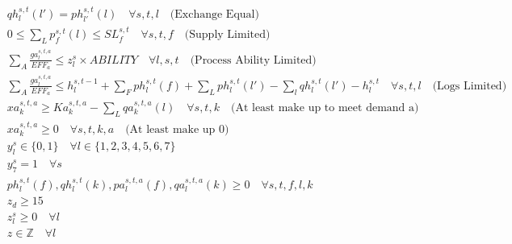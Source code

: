 \documentclass[fleqn,10pt]{wlscirep}
\begin{document}
{\begin{align}
    & qh_{l}^{s, t}(l') = ph_{l'}^{s, t}(l) \quad \forall s, t, l \quad \text{(Exchange Equal)} \\
    & 0 \leq \sum_{L} p_{f}^{s, t}(l) \leq SL_{f}^{s, t} \quad \forall s, t, f  \quad \text{(Supply Limited)} \\
    & \sum_A \frac{ga_{l}^{s, t, a}}{EFF_a} \leq z_{l}^{s} \times ABILITY \quad \forall l, s, t \quad \text{(Process Ability Limited)} \\
    & \sum_A \frac{ga_{l}^{s, t, a}}{EFF_a} \leq h_{l}^{s, t-1} + \sum_{F} ph_{l}^{s, t}(f) + \sum_{L} ph_{l}^{s, t}(l') - \sum_{l} qh_{l}^{s, t}(l') - h_{l}^{s, t} \quad \forall s, t, l \quad \text{(Logs Limited)} \\
    & xa_{k}^{s, t, a} \geq Ka_{k}^{s, t, a} - \sum_{L} qa_{k}^{s, t, a}(l) \quad \forall s, t, k \quad \text{(At least make up to meet demand a)} \\
    & xa_{k}^{s, t, a} \geq 0 \quad \forall s, t, k, a \quad \text{(At least make up 0)} \\
    & y_{l}^{s} \in \{0, 1\} \quad \forall l \in \{1, 2, 3, 4, 5, 6, 7 \} \\
    & y_{7}^{s} = 1 \quad \forall s \\
    & ph_{l}^{s, t}(f), qh_{l}^{s, t}(k), pa_{l}^{s, t, a}(f), qa_{l}^{s, t, a}(k) \geq 0 \quad \forall s, t, f, l, k \\
    & z_{d} \geq 15 \\
    & z_{l}^{s} \geq 0 \quad \forall l \\
    & z \in \mathbb{Z} \quad \forall l
\end{align}
}%
\end{document}
